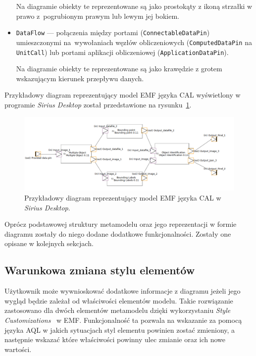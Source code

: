 \begin{itemize}
	      Na diagramie obiekty te reprezentowane są jako prostokąty z ikoną strzałki w prawo z~pogrubionym prawym lub lewym jej bokiem.

	\item \texttt{DataFlow} --- połączenia między portami
	      (\texttt{ConnectableDataPin}) umieszczonymi na~wywołaniach węzłów
	      obliczeniowych (\texttt{ComputedDataPin} na \texttt{UnitCall}) lub portami aplikacji obliczeniowej (\texttt{ApplicationDataPin}).

	      Na diagramie obiekty te reprezentowane są jako krawędzie z grotem wskazującym kierunek przepływu danych.
\end{itemize}

Przykładowy diagram reprezentujący model EMF języka CAL wyświetlony w programie
\emph{Sirius Desktop} został przedstawione na
rysunku~\ref{rys:sirius-desktop-cal-example-model}.

\begin{figure}[!hb]
	\centering

	\includegraphics[width=0.95\linewidth]{./images/sirius-desktop-cal-example-model.png}
	\caption{Przykładowy diagram reprezentujący model EMF języka CAL w
		\emph{Sirius Desktop}.}\label{rys:sirius-desktop-cal-example-model}
\end{figure}

Oprócz podstawowej struktury metamodelu oraz jego reprezentacji w formie
diagramu zostały do niego dodane dodatkowe funkcjonalności. Zostały one opisane
w kolejnych sekcjach.

\subsection{Warunkowa zmiana stylu elementów}

Użytkownik może wywnioskować dodatkowe informacje z diagramu jeżeli jego wygląd
będzie zależał od właściwości elementów modelu. Takie rozwiązanie zastosowano
dla dwóch elementów metamodelu dzięki wykorzystaniu \emph{Style
	Customizations}~\cite{sirius-desktop-documentation-style-customizations}
w \gls{EMF}.
Funkcjonalność ta pozwala na wskazanie za pomocą języka \gls{AQL} w jakich
sytuacjach styl elementu powinien zostać zmieniony, a następnie wskazać które
właściwości powinny ulec zmianie oraz ich nowe wartości.


